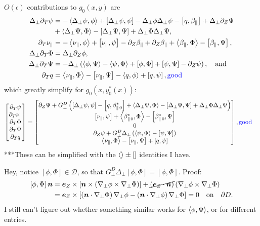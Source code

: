 \documentclass{article}
\newcommand{\para}{\parallel}
\newcommand{\ep}{\epsilon}
\newcommand{\np}{\nabla_\perp}
\newcommand{\lap}{\Delta_\perp}
\newcommand{\p}{\partial}
\newcommand{\GD}{G_\perp^D}
\newcommand{\pth} [1] {\left( #1 \right) }
\newcommand{\br} [1] {\left[ #1 \right] }
\newcommand{\bmat} [1] {\begin{bmatrix} #1 \end{bmatrix}}
\begin{document}
$O(\ep)$ contributions to $g_0(x,y)$ are 
\begin{align*}
    \lap\p_T\psi &= - \Braket{\lap\psi, \phi} + \br{\lap\psi, \psi} - \lap\phi\lap\psi - \br{q,\beta_\para} + \lap\p_Z\Psi \\ 
        &+ \Braket{\lap\Psi, \Phi} - \br{\lap\Psi, \Psi} + \lap\Phi\lap\Psi, \\ 
    \p_T\nu_\para &= - \Braket{\nu_\para, \phi} + \br{\nu_\para, \psi} - \p_Z\beta_\para + \p_Z\beta_\para + \Braket{\beta_\para,\Phi} -\br{\beta_\para, \Psi}, \\ 
    \lap \p_T\Phi &= \lap \p_Z\phi, \\ 
    \lap \p_T\Psi &= - \lap\pth{\Braket{\phi, \Psi} - \Braket{\psi, \Phi} + \br{\phi, \Phi} + \br{\psi, \Psi} - \p_Z\psi}, \quad\text{and} \\ 
    \p_Tq &= \Braket{\nu_\para, \Phi} - \br{\nu_\para, \Psi} - \Braket{q, \phi} + \br{q, \psi}, \text{\color{blue}good}
\end{align*}
which greatly simplify for $g_0(x,y_0^*(x))$: 
\begin{align*}
    \bmat{\p_T\psi \\ \p_T\nu_\para \\ \p_T\Phi \\ \p_T\Psi \\ \p_Tq} 
    &= \bmat{\p_Z\Psi + \GD\pth{ \br{\lap\psi, \psi} - \br{q,\beta_{\para\,0}^*} + \Braket{\lap\Psi, \Phi} - \br{\lap\Psi, \Psi} + \lap\Phi\lap\Psi} \\ 
    \br{\nu_\para, \psi} + \Braket{\beta_{\para\,0}^*,\Phi} - \br{\beta_{\para\,0}^*, \Psi} \\ 
    0 \\ 
    \p_Z\psi + \GD\lap\pth{\Braket{\psi, \Phi} - \br{\psi, \Psi}} \\ 
    \Braket{\nu_\para, \Phi} - \br{\nu_\para, \Psi} + \br{q, \psi}}, \text{\color{blue}good}
\end{align*}
***These can be simplified with the $\Braket{} \pm \br{}$ identities I have. 

Hey, notice $\br{\phi,\Phi}\in\mathcal{D}$, so that $\GD\lap\br{\phi,\Phi} = \br{\phi,\Phi}$. Proof: 
\begin{align*}
    \br{\phi,\Phi}\bm{n} &= \bm{e}_Z\times \br{\bm{n}\times \pth{\np\phi\times\np\Phi}} + \cancel{\pth{\bm{e}_Z\cdot\bm{n}}} \pth{\np\phi\times\np\Phi} \\ 
    &= \bm{e}_Z\times \br{\pth{\bm{n}\cdot\np\Phi}\np\phi - \pth{\bm{n}\cdot\np\phi}\np\Phi} = 0 \quad\text{on}\quad \p D. 
\end{align*}
I still can't figure out whether something similar works for $\Braket{\phi,\Phi}$, or for different entries. 
\end{document}

